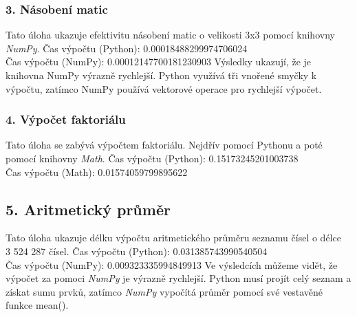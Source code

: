 \documentclass[a4paper,12pt]{article}
\begin{document}
\subsubsection{3. Násobení matic}
Tato úloha ukazuje  efektivitu násobení matic o velikosti 3x3 pomocí knihovny \textit{NumPy}.
\justify
Čas výpočtu (Python):  0.00018488299974706024\\
Čas výpočtu (NumPy):  0.00012147700181230903
\justify
Výsledky ukazují, že je knihovna NumPy výrazně rychlejší. Python využívá tři vnořené smyčky k výpočtu, zatímco NumPy používá vektorové operace pro rychlejší výpočet.\\
\subsubsection{4. Výpočet faktoriálu}
Tato úloha se zabývá výpočtem faktoriálu. Nejdřív pomocí Pythonu a poté pomocí
knihovny \textit{Math}.
\justify
Čas výpočtu (Python):  0.15173245201003738\\
Čas výpočtu (Math):  0.01574059799895622\\
\subsection{5. Aritmetický průměr}
Tato úloha ukazuje délku výpočtu aritmetického průměru seznamu čísel o délce\\3 524 287 čísel. 
\justify
Čas výpočtu (Python):  0.031385743990540504\\
Čas výpočtu (NumPy):   0.009323335994849913
\justify
Ve výsledcích můžeme vidět, že výpočet za pomoci \textit{NumPy} je výrazně rychlejší. Python musí projít celý seznam a získat sumu prvků, zatímco \textit{NumPy} vypočítá průměr pomocí své vestavěné funkce mean().\\

	
\end{document}
